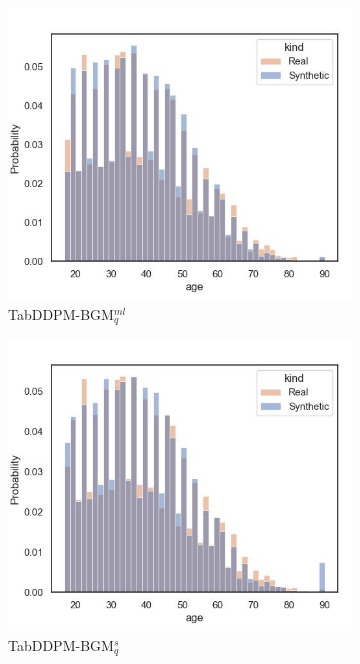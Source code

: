 \begin{figure}[h]
\begin{subfigure}{0.23\textwidth}
		\includegraphics[width=\textwidth]{images/dist_age/tab-ddpm-bgm.jpg}
		\caption{TabDDPM-BGM$^{ml}_q$}
	\end{subfigure}
	\begin{subfigure}{0.23\textwidth}
		\centering
		\includegraphics[width=\textwidth]{images/dist_age/tab-ddpm-bgm-simTune.jpg}
		\caption{TabDDPM-BGM$^{s}_q$}
	\end{subfigure}
	\begin{subfigure}{0.23\textwidth}
		\centering

\end{subfigure}
\end{figure}
